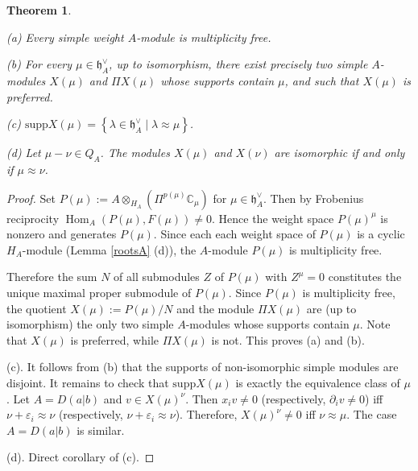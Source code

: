 \documentclass[12pt]{amsart}
\makeatletter
\def\@putname#1#2#3#4{\def\@@ref{#3}\let\old@bf\bf
        \def\bf##1{\old@bf\if?\noexpand##1?{#4}\else##1\fi}%
	#1{#2}%
        \let\bf\old@bf}
\def\@putname#1#2#3#4{\def\@@ref{#3}\let\old@bf\bf	%
	\let\old@reset@font\reset@font			%
        \def\bf##1{\old@bf\if?\noexpand##1?{#4}\else##1\fi}%
	\def\reset@font##1##2{\old@reset@font##1\if?\noexpand##2?{#4}\else##2\fi}#1{#2}%
        \let\bf\old@bf\let\reset@font\old@reset@font}
\let\my@ref=\ref
\def\ref#1{\@putname\my@ref{#1}{#1}{\tiny\rm\@@ref}}
\theoremstyle{plain} %
\numberwithin{equation}{section}
\theoremstyle{definition}
\theoremstyle{remark}
\theoremstyle{plain} %
\newtheorem{theorem}[definition]{Theorem}
\newcommand{\CC}{\mathbb{C}}
\newcommand{\supp}{\mathrm{supp}}
\newcommand{\gh}{\mathfrak{h}}
\def\gh{\mathfrak{h}}
\makeatother
\begin{document}
        \begin{theorem}\label{thm:weightA}

          (a) Every simple weight $A$-module is multiplicity free.

          (b)  For every $\mu\in \gh^{\vee}_A$, up to isomorphism,  there exist precisely two simple $A$-modules $X(\mu)$ and $\Pi X(\mu)$ whose supports contain  $\mu$, and such that $X(\mu)$ is preferred.
          
            (c)  $ \supp X(\mu) = \left\{\lambda \in \gh_A^\vee  \; | \; \lambda \approx \mu \right\}$.
                        
          (d) Let $\mu - \nu \in Q_A$.      The modules $X(\mu)$ and $X(\nu)$ are isomorphic if and only if  $\mu  \approx \nu$.
        \end{theorem}
        \begin{proof} Set $P(\mu):=A\otimes_{H_A}\left( \Pi^{p(\mu)}\CC_\mu \right)$ for $\mu\in \gh^{\vee}_A$.  Then by Frobenius reciprocity
          $\operatorname{Hom}_A(P(\mu),F(\mu))\neq 0$. Hence  the weight space $P(\mu)^{\mu}$ is nonzero  and generates $P(\mu)$. Since each each weight space of $P(\mu)$  is a cyclic $H_A$-module (Lemma \ref{rootsA}(d)), the $A$-module $P(\mu)$ is multiplicity free.

          Therefore the sum $N$ of all submodules $Z$ of $P(\mu)$ with $Z^{\mu} = 0$ constitutes the 
 unique maximal proper submodule of $P(\mu)$.  Since $P(\mu)$ is multiplicity free, 
         the quotient
          $X(\mu):=P(\mu)/N$ and the module $\Pi X(\mu)$ are (up to isomorphism) the only two simple $A$-modules  whose supports contain  $\mu$. Note that  $X(\mu)$ is preferred, while  $\Pi X(\mu)$ is not. This proves (a) and (b).
          
          (c). It follows from (b) that the supports of non-isomorphic  simple modules are disjoint. It remains to check that
          $\supp X(\mu)$ is exactly the equivalence class of $\mu$. Let $A=D(a|b)$ and $v\in X(\mu)^{\nu}$. Then $x_iv\neq 0$
          (respectively, $\partial_i v\neq 0$) iff $\nu+\varepsilon_i\approx \nu$ (respectively, $\nu+\varepsilon_i\approx \nu$). Therefore,
          $X(\mu)^\nu\neq 0$ iff $\nu\approx\mu$. The case $A=D(a|b)$ is similar.
       
                                
            (d).           Direct corollary of (c).
          \end{proof}
        
        
        
\end{document}
